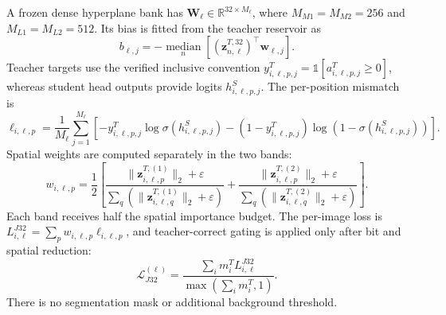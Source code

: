 A frozen dense hyperplane bank has
$\bm W_\ell\in\mathbb{R}^{32\times M_\ell}$, where
$M_{M1}=M_{M2}=256$ and $M_{L1}=M_{L2}=512$. Its bias is fitted from the
teacher reservoir as
\begin{equation}
 b_{\ell,j}=-\operatorname*{median}_{n}
 \left[(\bm z_{n,\ell}^{T,32})^\top\bm w_{\ell,j}\right].
\end{equation}
Teacher targets use the verified inclusive convention
$y_{i,\ell,p,j}^{T}=\mathbb{1}[a_{i,\ell,p,j}^{T}\geq0]$, whereas student
head outputs provide logits $h_{i,\ell,p,j}^{S}$. The per-position mismatch is
\begin{equation}
\ell_{i,\ell,p}
=\frac{1}{M_\ell}\sum_{j=1}^{M_\ell}
\left[-y_{i,\ell,p,j}^{T}\log\sigma(h_{i,\ell,p,j}^{S})
-(1-y_{i,\ell,p,j}^{T})\log(1-\sigma(h_{i,\ell,p,j}^{S}))\right].
\label{eq:j32-bit-loss}
\end{equation}
Spatial weights are computed separately in the two bands:
\begin{equation}
    w_{i,\ell,p}
    =\frac12\left[
      \frac{\|\bm z_{i,\ell,p}^{T,(1)}\|_2+\varepsilon}
           {\sum_q(\|\bm z_{i,\ell,q}^{T,(1)}\|_2+\varepsilon)}
      +
      \frac{\|\bm z_{i,\ell,p}^{T,(2)}\|_2+\varepsilon}
           {\sum_q(\|\bm z_{i,\ell,q}^{T,(2)}\|_2+\varepsilon)}
    \right].
\label{eq:j32-weights}
\end{equation}
Each band receives half the spatial importance budget. The per-image loss is
$L_{i,\ell}^{J32}=\sum_p w_{i,\ell,p}\ell_{i,\ell,p}$, and teacher-correct
gating is applied only after bit and spatial reduction:
\begin{equation}
    \mathcal{L}_{J32}^{(\ell)}
    =\frac{\sum_i m_i^T L_{i,\ell}^{J32}}
           {\max(\sum_i m_i^T,1)}.
\label{eq:j32-gate}
\end{equation}
There is no segmentation mask or additional background threshold.

\begin{center}
\end{center}

